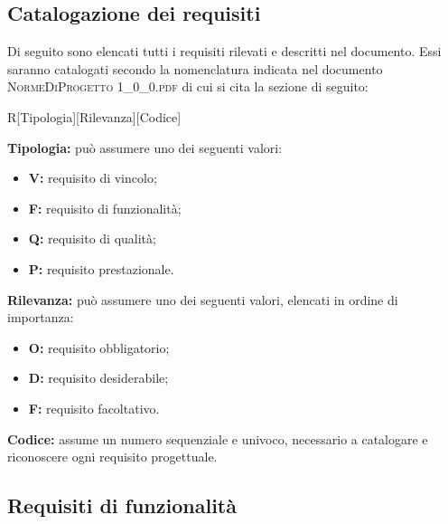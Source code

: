 \subsection{Catalogazione dei requisiti}

Di seguito sono elencati tutti i requisiti rilevati e descritti nel documento. Essi saranno catalogati secondo la nomenclatura indicata nel documento \textsc{NormeDiProgetto 1\_0\_0.pdf} di cui si cita la sezione di seguito:

\begin{center}
	R[Tipologia][Rilevanza][Codice]
\end{center}
\textbf{Tipologia:} può assumere uno dei seguenti valori:
\begin{itemize}
	\item \textbf{V:} requisito di vincolo;
	\item \textbf{F:} requisito di funzionalità;
	\item \textbf{Q:} requisito di qualità;
	\item \textbf{P:} requisito prestazionale.
\end{itemize}
\textbf{Rilevanza:} può assumere uno dei seguenti valori, elencati in ordine di importanza:
\begin{itemize}
	\item \textbf{O:} requisito obbligatorio;
	\item \textbf{D:} requisito desiderabile;
	\item \textbf{F:} requisito facoltativo.
\end{itemize}
\textbf{Codice:} assume un numero sequenziale e univoco, necessario a catalogare e riconoscere ogni requisito progettuale.

\subsection{Requisiti di funzionalità}

